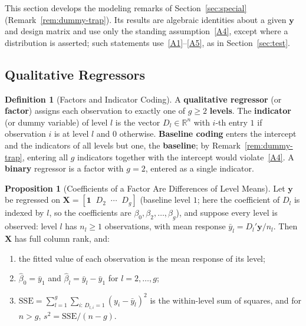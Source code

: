 \documentclass[12pt,a4paper]{article}
\theoremstyle{definition}
\newtheorem{definition}[theorem]{Definition}
\newtheorem{proposition}[theorem]{Proposition}
\newcommand{\SSE}{\mathrm{SSE}}
\newcommand{\bX}{\mathbf{X}}
\newcommand{\by}{\mathbf{y}}
\newcommand{\bone}{\mathbf{1}}
\newcommand{\Real}{\mathbb{R}}
\begin{document}
This section develops the modeling remarks of Section~\ref{sec:special} (Remark~\ref{rem:dummy-trap}). Its results are algebraic identities about a given $\by$ and design matrix and use only the standing assumption~\ref{A4}, except where a distribution is asserted; such statements use~\ref{A1}--\ref{A5}, as in Section~\ref{sec:test}.

\subsection{Qualitative Regressors}

\begin{definition}[Factors and Indicator Coding]\label{def:factor}
A \textbf{qualitative regressor} (or \textbf{factor}) assigns each observation to exactly one of $g \geqslant 2$ \textbf{levels}. The \textbf{indicator} (or dummy variable) of level $l$ is the vector $D_l \in \Real^n$ with $i$-th entry $1$ if observation $i$ is at level $l$ and $0$ otherwise. \textbf{Baseline coding} enters the intercept and the indicators of all levels but one, the \textbf{baseline}; by Remark~\ref{rem:dummy-trap}, entering all $g$ indicators together with the intercept would violate~\ref{A4}. A \textbf{binary} regressor is a factor with $g = 2$, entered as a single indicator.
\end{definition}

\begin{proposition}[Coefficients of a Factor Are Differences of Level Means]\label{prop:level-means}
Let $\by$ be regressed on $\bX = [\bone \;\; D_2 \;\; \cdots \;\; D_g]$ (baseline level $1$; here the coefficient of $D_l$ is indexed by $l$, so the coefficients are $\beta_0, \beta_2, \ldots, \beta_g$), and suppose every level is observed: level $l$ has $n_l \geqslant 1$ observations, with mean response $\bar y_l = D_l'\by/n_l$. Then $\bX$ has full column rank, and:
\begin{enumerate}[label=\textup{(\roman*)}]
\item the fitted value of each observation is the mean response of its level;
\item $\hat\beta_0 = \bar y_1$ and $\hat\beta_l = \bar y_l - \bar y_1$ for $l = 2, \ldots, g$;
\item $\SSE = \sum_{l=1}^g\sum_{i:\,D_{l,i} = 1}(y_i - \bar y_l)^2$ is the within-level sum of squares, and for $n > g$, $s^2 = \SSE/(n-g)$.
\end{enumerate}
\end{proposition}
\end{document}
